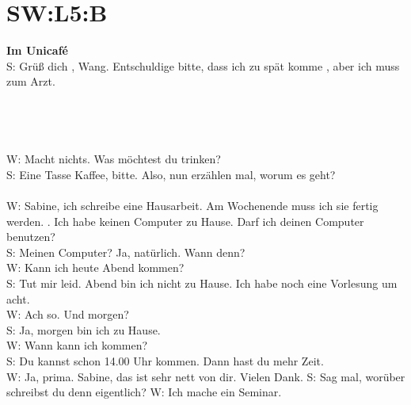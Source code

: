 \section{SW:L5:B}
\textbf{Im Unicafé} \\
\noindent
S: Grüß dich , Wang. Entschuldige bitte, dass ich zu spät komme , aber ich muss zum Arzt. \\
\\
\\
\\
\\
\noindent
W: Macht nichts.  Was möchtest du trinken? \\
S: Eine Tasse Kaffee, bitte. Also, nun erzählen mal, worum es geht?  \\
\\
\noindent
W: Sabine, ich schreibe eine Hausarbeit. Am Wochenende muss ich sie fertig werden. . Ich habe keinen Computer zu Hause. Darf ich deinen Computer benutzen?  \\
S: Meinen Computer? Ja, natürlich. Wann denn? \\
W: Kann ich heute Abend kommen? \\
S: Tut mir leid.  Abend bin ich nicht zu Hause. Ich habe noch eine Vorlesung um acht.  \\
W: Ach so. Und morgen? \\
S: Ja, morgen bin ich zu Hause. \\
W: Wann kann ich kommen? \\
S: Du kannst schon 14.00 Uhr kommen. Dann hast du mehr Zeit.  \\
W: Ja, prima.  Sabine, das ist sehr nett von dir. Vielen Dank.
S: Sag mal, worüber schreibst du denn eigentlich? 
W: Ich mache ein Seminar.  \\

